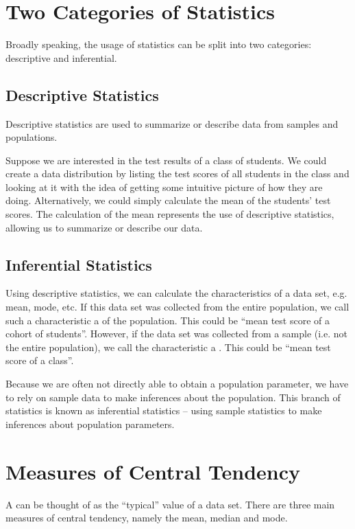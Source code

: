 \section{Two Categories of Statistics}

Broadly speaking, the usage of statistics can be split into two categories: descriptive and inferential.

\subsection{Descriptive Statistics}

Descriptive statistics are used to summarize or describe data from samples and populations.

Suppose we are interested in the test results of a class of students. We could create a data distribution by listing the test scores of all students in the class and looking at it with the idea of getting some intuitive picture of how they are doing. Alternatively, we could simply calculate the mean of the students' test scores. The calculation of the mean represents the use of descriptive statistics, allowing us to summarize or describe our data.

\subsection{Inferential Statistics}

Using descriptive statistics, we can calculate the characteristics of a data set, e.g. mean, mode, etc. If this data set was collected from the entire population, we call such a characteristic a  of the population. This could be ``mean test score of a cohort of students''. However, if the data set was collected from a sample (i.e. not the entire population), we call the characteristic a . This could be ``mean test score of a class''.

Because we are often not directly able to obtain a population parameter, we have to rely on sample data to make inferences about the population. This branch of statistics is known as inferential statistics -- using sample statistics to make inferences about population parameters. 

\section{Measures of Central Tendency}

A  can be thought of as the ``typical'' value of a data set. There are three main measures of central tendency, namely the mean, median and mode.

